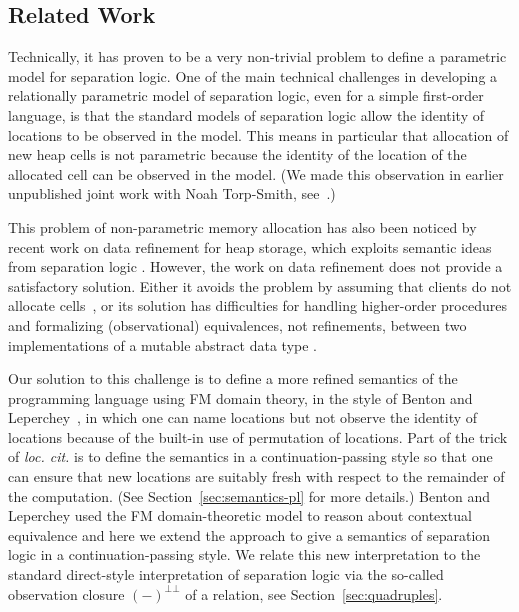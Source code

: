 \documentclass{LMCS}
\newcommand{\mperp}{{\bot{\!\!}\bot}}
\begin{document}
\subsection{Related Work}
\label{sec:related-work} 
Technically, it has proven to be a very non-trivial problem to define
a parametric model for separation logic. 
One of the main technical challenges in developing a relationally
parametric model of separation logic, even for a simple first-order
language, is that the standard models of separation logic allow the
identity of locations to be observed in the model.  This means in
particular that allocation of new heap cells is not parametric because the
identity of the location of the allocated cell can be observed in the
model.  (We made this observation in earlier unpublished joint work with
Noah Torp-Smith, see~\cite[Ch.~6]{torp-smith-phd-2005}.)

This problem of non-parametric memory allocation has also been noticed by
recent work on data refinement for heap storage, which exploits semantic
ideas from separation logic
\cite{mijajlovic-torpsmith-ohearn-fsttcs04,mijajlovic-yang-aplas05}.
However, the work on data refinement does not provide a satisfactory
solution.  Either it avoids the problem by assuming that clients do not
allocate cells~\cite{mijajlovic-torpsmith-ohearn-fsttcs04}, or its solution
has difficulties for handling higher-order procedures and formalizing
(observational) equivalences, not refinements, between two implementations
of a mutable abstract data type \cite{mijajlovic-yang-aplas05}.

Our solution to this challenge is to define a more refined semantics of the
programming language using FM domain theory, in the style of Benton and
Leperchey~\cite{benton}, in which one can name locations but not observe the
identity of locations because of the built-in use of permutation of
locations. 
Part of the trick of \emph{loc. cit.} is to define the semantics
in a continuation-passing style so that one can ensure that new locations
are suitably fresh with respect to the remainder of the computation. (See
Section~\ref{sec:semantics-pl} for more details.)  Benton and Leperchey
used the FM domain-theoretic model to reason about contextual equivalence
and here we extend the approach to give a semantics of separation logic in
a continuation-passing style. We relate this new interpretation to the
standard direct-style interpretation of separation logic via the so-called
observation closure $(-)^\mperp$ of a relation, see
Section~\ref{sec:quadruples}.
\end{document}
